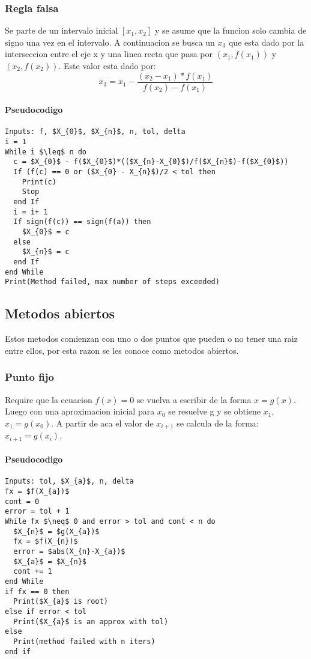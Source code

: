 \documentclass[11pt]{article}
\begin{document}
\subsubsection{Regla falsa}
Se parte de un intervalo inicial $[x_{1},x_{2}]$ y se asume que la funcion solo cambia de signo una vez en el intervalo. A continuacion se busca un $x_{3}$ que esta dado por la interseccion entre el eje x y una linea recta que pasa por $(x_{1},f(x_{1}))$ y $(x_{2},f(x_{2}))$. Este valor esta dado por: \[ x_{3} = x_{1} - \dfrac{(x_{2}-x_{1})*f(x_{1})}{f(x_{2})-f(x_{1})} \]
\paragraph{Pseudocodigo\\}
\begin{lstlisting}[frame=single, mathescape=true]
Inputs: f, $X_{0}$, $X_{n}$, n, tol, delta
i = 1
While i $\leq$ n do
  c = $X_{0}$ - f($X_{0}$)*(($X_{n}-X_{0}$)/f($X_{n}$)-f($X_{0}$))
  If (f(c) == 0 or ($X_{0} - X_{n}$)/2 < tol then
    Print(c)
    Stop
  end If
  i = i+ 1                                                         
  If sign(f(c)) == sign(f(a)) then 
    $X_{0}$ = c 
  else
    $X_{n}$ = c
  end If
end While
Print(Method failed, max number of steps exceeded)

\end{lstlisting}

\subsection{Metodos abiertos}
Estos metodos comienzan con uno o dos puntos que pueden o no tener una raiz entre ellos, por esta razon se les conoce como metodos abiertos.
\subsubsection{Punto fijo}
Require que la ecuacion $f(x) = 0$ se vuelva a escribir de la forma $x = g(x)$. Luego con una aproximacion inicial para $x_{0}$ se resuelve g y se obtiene $x_{1}$, $x_{1} = g(x_{0})$. A partir de aca el valor de $x_{i+1}$ se calcula de la forma: $x_{i+1} = g(x_{i})$.

\paragraph{Pseudocodigo\\}
\begin{lstlisting}[frame=single, mathescape=true]
Inputs: tol, $X_{a}$, n, delta
fx = $f(X_{a})$  
cont = 0
error = tol + 1
While fx $\neq$ 0 and error > tol and cont < n do
  $X_{n}$ = $g(X_{a})$
  fx = $f(X_{n})$
  error = $abs(X_{n}-X_{a})$
  $X_{a}$ = $X_{n}$
  cont += 1
end While
if fx == 0 then
  Print($X_{a}$ is root)
else if error < tol 
  Print($X_{a}$ is an approx with tol)
else
  Print(method failed with n iters)
end if
\end{lstlisting}
\end{document}

